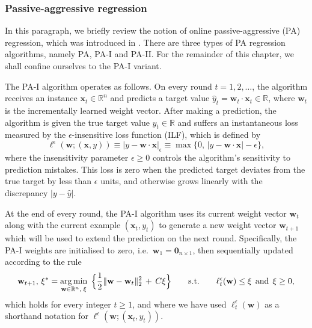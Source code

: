 \subsubsection{Passive-aggressive regression}

In this paragraph, we briefly review the notion of online passive-aggressive (PA) regression, which was introduced in \citet{crammer06}. There are three types of PA regression algorithms, namely PA, PA-I and PA-II. For the remainder of this chapter, we shall confine ourselves to the PA-I variant.

The PA-I algorithm operates as follows. On every round $t = 1, 2, \ldots$, the algorithm receives an instance $\mathbf{x}_t \in \mathbb{R}^n$ and predicts a target value $\hat{y}_t = \mathbf{w}_t \cdot \mathbf{x}_t \in \mathbb{R}$, where $\mathbf{w}_t$ is the incrementally learned weight vector. After making a prediction, the algorithm is given the true target value $y_t \in \mathbb{R}$ and suffers an instantaneous loss measured by the $\epsilon$-insensitive loss function (ILF), which is defined by
\begin{equation}
\label{eq:ilf}
	\ell^{\epsilon}(\mathbf{w}; (\mathbf{x}, y))
	\equiv |y - \mathbf{w}\cdot\mathbf{x}|_{\epsilon}
	\equiv \max\Big\{0,\, |y - \mathbf{w}\cdot\mathbf{x}| - \epsilon\Big\},
\end{equation}
where the insensitivity parameter $\epsilon \geq 0$ controls the algorithm's sensitivity to prediction mistakes. This loss is zero when the predicted target deviates from the true target by less than $\epsilon$ units, and otherwise grows linearly with the discrepancy $|y - \hat{y}|$.

At the end of every round, the PA-I algorithm uses its current weight vector $\mathbf{w}_t$ along with the current example $(\mathbf{x}_t, y_t)$ to generate a new weight vector $\mathbf{w}_{t+1}$ which will be used to extend the prediction on the next round. Specifically, the PA-I weights are initialised to zero, i.e.\ $\mathbf{w}_1 = \mathbf{0}_{n\times 1}$, then sequentially updated according to the rule
\begin{equation}
\label{eq:PA-I-update-rule}
	\mathbf{w}_{t+1},\, \xi^*
	= \operatorname*{arg\,min}_{\mathbf{w}\in\mathbb{R}^n,\; \xi} \; \Big\{\frac{1}{2}\Vert\mathbf{w} - \mathbf{w}_t\Vert_2^2 \, + \, C\xi\Big\}
	\qquad \text{s.t.} \qquad
	\ell_t^{\epsilon}(\mathbf{w}) \leq \xi \;\, \text{and} \;\, \xi \geq 0,
\end{equation}
which holds for every integer $t \geq 1$, and where we have used $\ell_t^{\epsilon}(\mathbf{w})$ as a shorthand notation for $\ell^{\epsilon}(\mathbf{w}; (\mathbf{x}_t, y_t))$.

